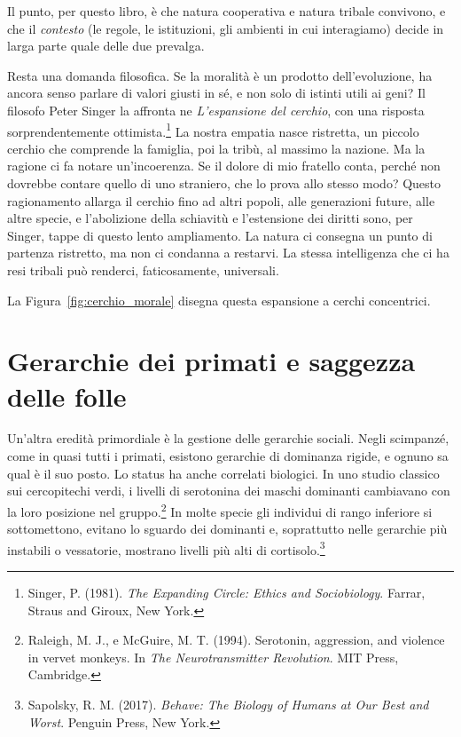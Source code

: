 Il punto, per questo libro, è che natura cooperativa e natura tribale convivono, e che il \textit{contesto} (le regole, le istituzioni, gli ambienti in cui interagiamo) decide in larga parte quale delle due prevalga.

Resta una domanda filosofica. Se la moralità è un prodotto dell'evoluzione, ha ancora senso parlare di valori giusti in sé, e non solo di istinti utili ai geni? Il filosofo Peter Singer la affronta ne \textit{L'espansione del cerchio}, con una risposta sorprendentemente ottimista.\footnote{Singer, P. (1981). \textit{The Expanding Circle: Ethics and Sociobiology}. Farrar, Straus and Giroux, New York.} La nostra empatia nasce ristretta, un piccolo cerchio che comprende la famiglia, poi la tribù, al massimo la nazione. Ma la ragione ci fa notare un'incoerenza. Se il dolore di mio fratello conta, perché non dovrebbe contare quello di uno straniero, che lo prova allo stesso modo? Questo ragionamento allarga il cerchio fino ad altri popoli, alle generazioni future, alle altre specie, e l'abolizione della schiavitù e l'estensione dei diritti sono, per Singer, tappe di questo lento ampliamento. La natura ci consegna un punto di partenza ristretto, ma non ci condanna a restarvi. La stessa intelligenza che ci ha resi tribali può renderci, faticosamente, universali.

La Figura~\ref{fig:cerchio_morale} disegna questa espansione a cerchi concentrici.


\section{Gerarchie dei primati e saggezza delle folle}

Un'altra eredità primordiale è la gestione delle gerarchie sociali. Negli scimpanzé, come in quasi tutti i primati, esistono gerarchie di dominanza rigide, e ognuno sa qual è il suo posto. Lo status ha anche correlati biologici. In uno studio classico sui cercopitechi verdi, i livelli di serotonina dei maschi dominanti cambiavano con la loro posizione nel gruppo.\footnote{Raleigh, M. J., e McGuire, M. T. (1994). Serotonin, aggression, and violence in vervet monkeys. In \textit{The Neurotransmitter Revolution}. MIT Press, Cambridge.} In molte specie gli individui di rango inferiore si sottomettono, evitano lo sguardo dei dominanti e, soprattutto nelle gerarchie più instabili o vessatorie, mostrano livelli più alti di cortisolo.\footnote{Sapolsky, R. M. (2017). \textit{Behave: The Biology of Humans at Our Best and Worst}. Penguin Press, New York.}

